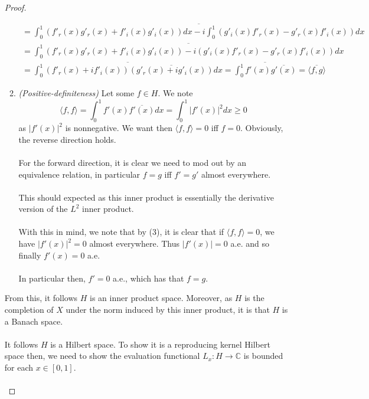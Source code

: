 \documentclass[12pt]{article}
\newenvironment{ex}[2][Exercise]{\begin{trivlist}
\item[\hskip \labelsep {\bfseries #1}\hskip \labelsep {\bfseries #2.}]}{\end{trivlist}}
\begin{document}
\begin{ex}{4}
\begin{enumerate}[label=(\alph*)]
\begin{proof}
\begin{enumerate}[label=(\roman*)]
\begin{equation}
\begin{aligned}
                        = \overline{\int_0^1 (f'_r(x)g'_r(x)+ f'_i(x)g'_i(x)) dx  - i \int_0^1 (g'_i(x)f'_r(x) - g'_r(x)f'_i(x)) dx} \\
                        = \overline{\int_0^1 (f'_r(x)g'_r(x)+ f'_i(x)g'_i(x)) - i(g'_i(x)f'_r(x) - g'_r(x)f'_i(x)) dx}  \\
                        = \overline{\int_0^1 (f'_r(x) + if'_i(x))\overline{(g'_r(x) + ig'_i(x))} dx} = \overline{\int_0^1 f'(x)\overline{g'(x)}}= \overline{\langle f, g \rangle} 
                    \end{aligned}
                \end{equation}
                \item \textit{(Positive-definiteness)} Let some $f \in H$. We note
                \begin{equation}
                    \langle f, f \rangle = \int_0^1 f'(x)\overline{f'(x)} dx = \int_0^1 |f'(x)|^2 dx \geq 0
                \end{equation}
                as $|f'(x)|^2$ is nonnegative. We want then $\langle f, f \rangle = 0$ iff $f = 0$. Obviously, the reverse direction holds. \\ \\
                For the forward direction, it is clear we need to mod out by an equivalence relation, in particular $f = g$ iff $f' = g'$ almost everywhere. \\ \\ This should expected as this inner product is essentially the derivative version of the $L^2$ inner product. \\ \\
                With this in mind, we note that by (3), it is clear that if $\langle f, f \rangle = 0$, we have $|f'(x)|^2 =0$ almost everywhere. Thus $|f'(x)| = 0$ a.e. and so finally $f'(x) = 0$ a.e.
                \\ \\ In particular then, $f' = 0$ a.e., which has that $f = g$.        
            \end{enumerate}
            From this, it follows $H$ is an inner product space. Moreover, as $H$ is the completion of $X$ under the norm induced by this inner product, it is that $H$ is a Banach space. \\ \\ It follows $H$ is a Hilbert space. To show it is a reproducing kernel Hilbert space then, we need to show the evaluation functional $L_x : H \rightarrow \mathbb{C}$ is bounded for each $x \in [0,1]$. \\ \\

\end{proof}
\end{enumerate}
\end{ex}
\end{document}

